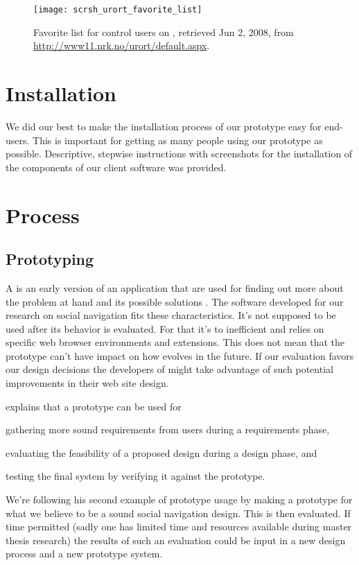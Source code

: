 \begin{figure}
  \texttt{[image: scrsh\_urort\_favorite\_list]}
  \caption[\urort{} Favorite List]{
    Favorite list for control users on \urort{},
    retrieved Jun 2, 2008, from
    \url{http://www11.nrk.no/urort/default.aspx}.
  }
  \label{figure:scrsh.urort.favorite.list}
\end{figure}

\section{Installation}

We did our best to make the installation process of our prototype easy
for end-users. This is important for getting as many people using our
prototype as possible.
Descriptive, stepwise instructions with screenshots for the installation of
the components of our client software was provided.

\section{Process}

\subsection{Prototyping}

A  is an early version of an application that are used for
finding out more about the problem at hand and its possible solutions
\citep[]{sommerville06}.
The software developed for our research on social navigation fits these
characteristics. It's not supposed to be used after its behavior is
evaluated. For that it's to inefficient and relies on specific web browser
environments and extensions. This does not mean that the prototype can't have
impact on how \urort{} evolves in the future. If our evaluation favors our
design decisions the developers of \urort{} might take advantage of such
potential improvements in their web site design.

\citet[]{sommerville06} explains that a prototype can be used for
\begin{inparaenum}[(i)]
  \item gathering more sound requirements from users during a
    requirements phase,
  \item evaluating the feasibility of a proposed design during a
    design phase, and
  \item testing the final system by verifying it against the prototype.
\end{inparaenum}
We're following his second example of prototype usage by making a prototype
for what we believe to be a sound social navigation design. This is then
evaluated. If time permitted (sadly one has limited time and resources
available during master thesis research) the results of such an evaluation
could be input in a new design process and a new prototype system.


